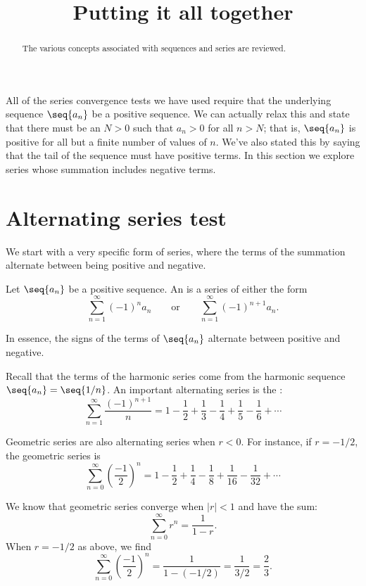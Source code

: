 \documentclass{ximera}
\title[Dig-In:]{Putting it all together}
\begin{document}
\begin{abstract}
The various concepts associated with sequences and series are reviewed.
\end{abstract}
\maketitle

All of the series convergence tests we have used require that the
underlying sequence $\seq{a_n}$ be a positive sequence. We can
actually relax this and state that there must be an $N>0$ such that
$a_n>0$ for all $n>N$; that is, $\seq{a_n}$ is positive for all but a
finite number of values of $n$.  We've also stated this by saying that 
the tail of the sequence must have positive terms. In this section we explore  series
whose summation includes negative terms.


\section{Alternating series test}

We start with a very specific form of series, where the terms of the
summation alternate between being positive and negative.

\begin{definition}
Let $\seq{a_n}$ be a positive sequence. An  is
a series of either the form 
\[
\sum_{n=1}^\infty (-1)^na_n\qquad \text{or}\qquad \sum_{n=1}^\infty (-1)^{n+1}a_n.
\]
\end{definition}

In essence, the signs of the terms of $\seq{a_n}$ alternate between 
positive and negative.

Recall that the terms of the harmonic series come from the harmonic sequence
$\seq{a_n} = \seq{1/n}$. An important alternating series is the
:
\[
\sum_{n=1}^\infty \frac{(-1)^{n+1}}{n} = 1-\frac12+\frac13-\frac14+\frac15-\frac16+\cdots
\]

Geometric series are also alternating series when $r<0$. For
instance, if $r=-1/2$, the geometric series is
\[
\sum_{n=0}^\infty \left(\frac{-1}{2}\right)^n = 1-\frac12+\frac14-\frac18+\frac1{16}-\frac1{32}+\cdots
\]

We know that geometric series converge when $|r|<1$ and have the sum:
\[
\sum_{n=0}^\infty r^n = \frac1{1-r}.
\]
When $r=-1/2$ as above, we find
\[
\sum_{n=0}^\infty \left(\frac{-1}{2}\right)^n = \frac1{1-(-1/2)} = \frac 1{3/2} = \frac23.
\]
\end{document}
